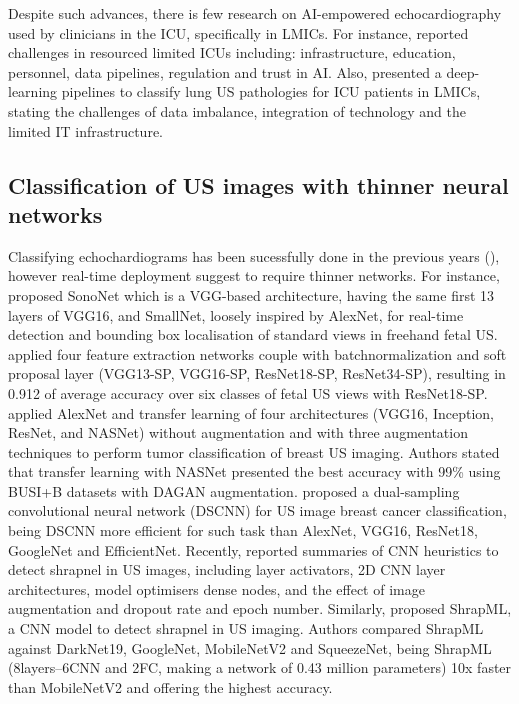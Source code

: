 \documentclass[mlabstract,twocolumn]{jmlr}
\begin{document}
Despite such advances, there is few research on AI-empowered echocardiography used by clinicians in the ICU, specifically in LMICs.
For instance, \cite{2021-huyNhat-vanHao-in-FAIR-MICCAI} reported challenges in resourced limited ICUs including: infrastructure, education, personnel, data pipelines, regulation and trust in AI.
Also, \cite{2021-kerdegari-Applied-Sciences-MDPI, 2021-kerdegari-ISBI-IEEE, 2021-huyNhat-kerdegari-in-FAIR-MICCAI} presented a deep-learning pipelines to classify lung US pathologies for ICU patients in LMICs, stating the challenges of data imbalance, integration of technology and the limited IT infrastructure.


\subsection{Classification of US images with thinner neural networks} \label{subsec:thinnerNets}
Classifying echochardiograms has been sucessfully done in the previous years (), however real-time deployment suggest to require thinner networks.
For instance, \citet{baumgartner2017-IEEETransMedImag} proposed SonoNet which is a VGG-based architecture, having the same first 13 layers of VGG16, and SmallNet, loosely inspired by AlexNet, for real-time detection and bounding box localisation of standard views in freehand fetal US.
\citet{toussaint2018-MICCAI} applied four feature extraction networks couple with batchnormalization and soft proposal layer (VGG13-SP, VGG16-SP, ResNet18-SP, ResNet34-SP), resulting in 0.912 of average accuracy over six classes of fetal US views with ResNet18-SP.
\citet{Al-Dhabyani2019-IJACSA} applied AlexNet and transfer learning of four architectures (VGG16, Inception, ResNet, and NASNet) without augmentation and with three augmentation techniques to perform tumor classification of breast US imaging.
Authors stated that transfer learning with NASNet presented the best accuracy with 99\% using BUSI+B datasets with DAGAN augmentation.
\citet{xie2020-physics-in-medicine-biology} proposed a dual-sampling convolutional neural network (DSCNN) for US image breast cancer classification, being DSCNN more efficient for such task than AlexNet, VGG16, ResNet18, GoogleNet and EfficientNet.
Recently, \citet{snider2022-ScientificReports} reported summaries of CNN heuristics to detect shrapnel in US images, including layer activators, 2D CNN layer architectures, model optimisers dense nodes, and the effect of image augmentation and dropout rate and epoch number.
Similarly, \citet{boice2022-in-jimaging} proposed ShrapML, a CNN model to detect shrapnel in US imaging.
Authors compared ShrapML against DarkNet19, GoogleNet, MobileNetV2 and SqueezeNet, being ShrapML (8layers--6CNN and 2FC, making a network of 0.43 million parameters) 10x faster than MobileNetV2 and offering the highest accuracy.
\end{document}
